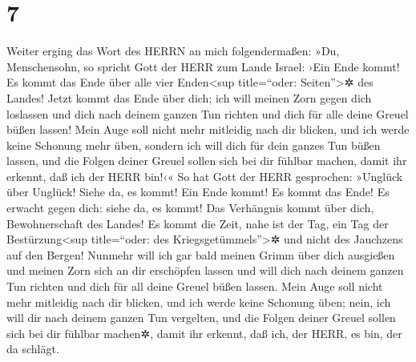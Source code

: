 \hypertarget{section-6}{%
\section{7}\label{section-6}}

Weiter erging das Wort des HERRN an mich folgendermaßen:
»Du, Menschensohn, so spricht Gott der HERR zum Lande
Israel: ›Ein Ende kommt! Es kommt das Ende über alle vier
Enden\textless sup title=``oder: Seiten''\textgreater✲ des Landes!
Jetzt kommt das Ende über dich; ich will meinen Zorn gegen
dich loslassen und dich nach deinem ganzen Tun richten und dich für alle
deine Greuel büßen lassen! Mein Auge soll nicht mehr
mitleidig nach dir blicken, und ich werde keine Schonung mehr üben,
sondern ich will dich für dein ganzes Tun büßen lassen, und die Folgen
deiner Greuel sollen sich bei dir fühlbar machen, damit ihr erkennt, daß
ich der HERR bin!‹« So hat Gott der HERR gesprochen:
»Unglück über Unglück! Siehe da, es kommt! Ein Ende kommt!
Es kommt das Ende! Es erwacht gegen dich: siehe da, es kommt!
Das Verhängnis kommt über dich, Bewohnerschaft des Landes!
Es kommt die Zeit, nahe ist der Tag, ein Tag der Bestürzung\textless sup
title=``oder: des Kriegsgetümmels''\textgreater✲ und nicht des Jauchzens
auf den Bergen! Nunmehr will ich gar bald meinen Grimm
über dich ausgießen und meinen Zorn sich an dir erschöpfen lassen und
will dich nach deinem ganzen Tun richten und dich für all deine Greuel
büßen lassen. Mein Auge soll nicht mehr mitleidig nach dir
blicken, und ich werde keine Schonung üben; nein, ich will dir nach
deinem ganzen Tun vergelten, und die Folgen deiner Greuel sollen sich
bei dir fühlbar machen✲, damit ihr erkennt, daß ich, der HERR, es bin,
der da schlägt.

